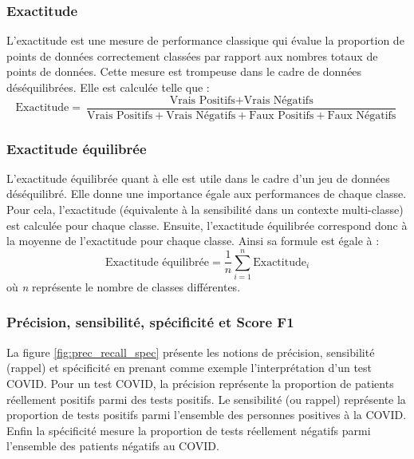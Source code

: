 \subsubsection{Exactitude}
L'exactitude est une mesure de performance classique qui évalue la proportion de points de données correctement classées par rapport aux nombres totaux de points de données. Cette mesure est trompeuse dans le cadre de données déséquilibrées. Elle est calculée telle que :
\[ \text{Exactitude} = \frac{\text{Vrais Positifs} + \text{Vrais Négatifs}}{\text{Vrais Positifs} + \text{Vrais Négatifs} + \text{Faux Positifs} + \text{Faux Négatifs}} \]

\subsubsection{Exactitude équilibrée}
L'exactitude équilibrée quant à elle est utile dans le cadre d'un jeu de données déséquilibré. Elle donne une importance égale aux performances de chaque classe. Pour cela, l'exactitude (équivalente à la sensibilité dans un contexte multi-classe) est calculée pour chaque classe. Ensuite, l'exactitude équilibrée correspond donc à la moyenne de l'exactitude pour chaque classe. Ainsi sa formule est égale à :
\[ \text{Exactitude équilibrée} = \frac{1}{n} \sum_{i=1}^{n} \text{Exactitude}_i \] où \textit{n} représente le nombre de classes différentes.

\subsubsection{Précision, sensibilité, spécificité et Score F1}
La figure \ref{fig:prec_recall_spec} présente les notions de précision, sensibilité (rappel) et spécificité en prenant comme exemple l'interprétation d'un test COVID. Pour un test COVID, la précision représente la proportion de patients réellement positifs parmi des tests positifs. Le sensibilité (ou rappel) représente la proportion de tests positifs parmi l'ensemble des personnes positives à la COVID. Enfin la spécificité mesure la proportion de tests réellement négatifs parmi l'ensemble des patients négatifs au COVID.

